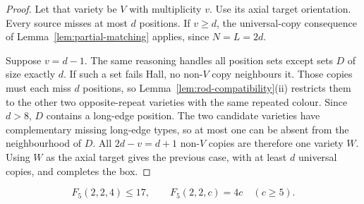 \begin{proof}
Let that variety be $V$ with multiplicity $v$. Use its axial target
orientation. Every source misses at most $d$ positions. If $v\ge d$, the universal-copy consequence of
Lemma~\ref{lem:partial-matching} applies, since $N=L=2d$.

Suppose $v=d-1$. The same reasoning handles all position sets except
sets $D$ of size exactly $d$. If such a set fails Hall, no non-$V$
copy neighbours it. Those copies must each miss $d$ positions, so
Lemma~\ref{lem:rod-compatibility}(ii) restricts them to the other two
opposite-repeat varieties with the same repeated colour. Since $d>8$,
$D$ contains a long-edge position. The two candidate varieties have
complementary missing long-edge types, so at most one can be absent
from the neighbourhood of $D$. All $2d-v=d+1$ non-$V$ copies are
therefore one variety $W$. Using $W$ as the axial target gives the
previous case, with at least $d$ universal copies, and completes the box.
\end{proof}

\begin{theorem}\label{thm:sharp-rods-upper}
\[
 F_5(2,2,4)\le17,
 \qquad
 F_5(2,2,c)=4c\quad(c\ge5).
\]
\end{theorem}

